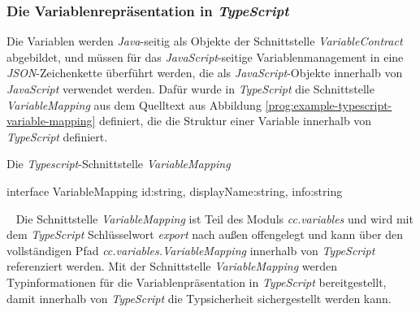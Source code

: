 \subsubsection{Die Variablenrepräsentation in \emph{TypeScript}}
Die Variablen werden \emph{Java}-seitig als Objekte der Schnittstelle \emph{VariableContract} abgebildet, und müssen für das \emph{JavaScript}-seitige Variablenmanagement in eine \emph{JSON}-Zeichenkette überführt werden, die als \emph{JavaScript}-Objekte innerhalb von \emph{JavaScript} verwendet werden. Dafür wurde in \emph{TypeScript} die Schnittstelle \emph{VariableMapping} aus dem Quelltext aus Abbildung \ref{prog:example-typescript-variable-mapping} definiert, die die Struktur einer Variable innerhalb von \emph{TypeScript} definiert.
\begin{program}[h]
\caption{Die \emph{Typescript}-Schnittstelle \emph{VariableMapping}}
\label{prog:example-typescript-variable-mapping}
\begin{JsCode}
interface VariableMapping {    
    id:string,       
    displayName:string,        
    info:string
}
\end{JsCode}
\end{program}
\ \newline
Die Schnittstelle \emph{VariableMapping} ist Teil des Moduls \emph{cc.variables} und wird mit dem  \emph{TypeScript} Schlüsselwort \emph{export} nach außen offengelegt und kann über den vollständigen Pfad \emph{cc.variables.VariableMapping} innerhalb von \emph{TypeScript} referenziert werden. Mit der Schnittstelle \emph{VariableMapping} werden Typinformationen für die Variablenpräsentation in \emph{TypeScript} bereitgestellt, damit innerhalb von \emph{TypeScript} die Typsicherheit sichergestellt werden kann.

